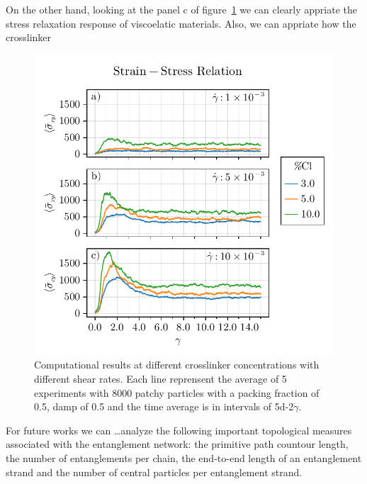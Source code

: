 On the other hand, looking at the panel c of figure~\ref{fig:stress-strainCLResults} we can clearly appriate the stress relaxation response of viscoelatic materials.
Also, we can appriate how the crosslinker 


\begin{figure}[ht!]
    \centering
    \includegraphics[width=\textwidth]{figs/ComputaitonalResults/zoom-clResponse.pdf}
    \caption{Computational results at different crosslinker concentrations with different shear rates. Each line reprensent the average of 5 experiments with \num{8000} patchy particles with a packing fraction of \num{0.5}, damp of \num{0.5} and the time average is in intervals of \num{5d-2}$\dot{\gamma}$.}\label{fig:stress-strainCLResults}
\end{figure}



For future works we can \dots analyze the following important topological measures associated with the entanglement network: the primitive path countour length, the number of entanglements per chain, the end-to-end length of an entanglement strand and the number of central particles per entanglement strand.




